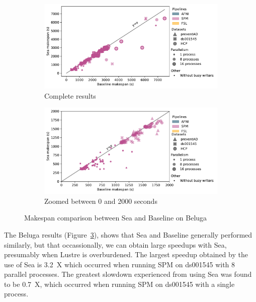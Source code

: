 \begin{figure}

\begin{subfigure}{\textwidth}
    \centering
    \captionsetup{width=.85\linewidth}
    \includegraphics[width=\columnwidth]{figures/sea-neuro/beluga_sea_all.pdf}%
    \caption{Complete results}\label{fig:seaneuro:belugafull}
\end{subfigure}
\begin{subfigure}{\textwidth}
    \centering
    \captionsetup{width=.85\linewidth}
    \includegraphics[width=\linewidth]{figures/sea-neuro/beluga_sea_zoom.pdf}
    \caption{Zoomed between 0 and 2000 seconds}\label{fig:seaneuro:belugazoom}
\end{subfigure}
\caption{Makespan comparison between Sea and Baseline on Beluga}
\label{fig:seaneuro:beluga}
\end{figure}

The Beluga results (Figure~\ref{fig:seaneuro:beluga}), 
shows that Sea and Baseline generally performed 
similarly, but that occassionally, we can obtain large 
speedups with Sea, presumably when Lustre is 
overburdened. The largest speedup obtained by the use of
Sea is 3.2~X which occurred when running SPM on ds001545 with 8 parallel processes. The greatest
slowdown experienced from using Sea was found to be 0.7~X, which occurred when running SPM on ds001545 with a single process. 

